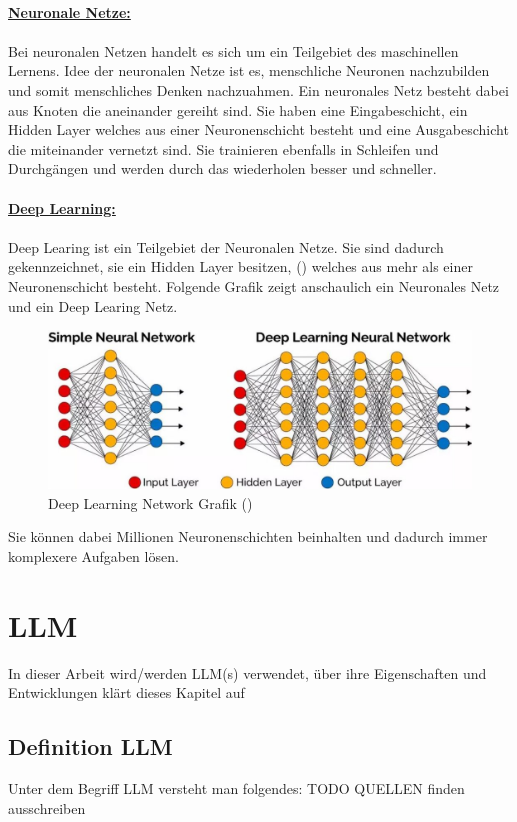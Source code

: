 \documentclass[12pt,toc=bib,toc=listof]{scrreprt}
\begin{document}
\\
\textbf{\underline{Neuronale Netze:}}\\
\\
Bei neuronalen Netzen handelt es sich um ein Teilgebiet des maschinellen Lernens. Idee der neuronalen Netze ist es, menschliche Neuronen nachzubilden und somit menschliches Denken nachzuahmen. Ein neuronales Netz besteht dabei aus Knoten die aneinander gereiht sind. Sie haben eine Eingabeschicht, ein Hidden Layer welches aus einer Neuronenschicht besteht und eine Ausgabeschicht die miteinander vernetzt sind. Sie trainieren ebenfalls in Schleifen und Durchgängen und werden durch das wiederholen besser und schneller.\\
\\
\textbf{\underline{Deep Learning:}}\\
\\
Deep Learing ist ein Teilgebiet der Neuronalen Netze. Sie sind dadurch gekennzeichnet, sie ein Hidden Layer besitzen, (\cite{Dymatrix2018}) welches aus mehr als einer Neuronenschicht besteht. Folgende Grafik zeigt anschaulich ein Neuronales Netz und ein Deep Learing Netz.
\begin{figure} [H]
    \centering
    \includegraphics[width=0.75\linewidth]{./Bilder/Dymatrix_Deep_Learning_Networks.jpg}
    \caption{Deep Learning Network Grafik (\cite{Dymatrix2018})}
    \label{fig:enter-label}
\end{figure}
\noindent Sie können dabei Millionen Neuronenschichten beinhalten und dadurch immer komplexere Aufgaben lösen.
\newpage

\noindent\section{LLM} %
\label{sec:llm}
In dieser Arbeit wird/werden LLM(s) verwendet, über ihre Eigenschaften und Entwicklungen klärt dieses Kapitel auf

\subsection{Definition LLM} %
\label{sec:definitionLLM}
Unter dem Begriff LLM versteht man folgendes:
TODO QUELLEN finden ausschreiben
\end{document}
